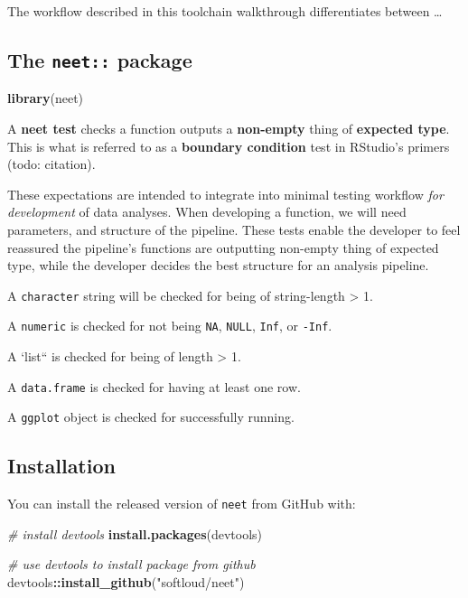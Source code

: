 \documentclass[
]{article}
\newenvironment{Shaded}{\begin{snugshade}}{\end{snugshade}}
\newcommand{\CommentTok}[1]{\textcolor[rgb]{0.56,0.35,0.01}{\textit{#1}}}
\newcommand{\KeywordTok}[1]{\textcolor[rgb]{0.13,0.29,0.53}{\textbf{#1}}}
\newcommand{\NormalTok}[1]{#1}
\newcommand{\OperatorTok}[1]{\textcolor[rgb]{0.81,0.36,0.00}{\textbf{#1}}}
\newcommand{\StringTok}[1]{\textcolor[rgb]{0.31,0.60,0.02}{#1}}
\begin{document}
The workflow described in this toolchain walkthrough differentiates
between \ldots{}

\hypertarget{the-neet-package}{%
\subsection{\texorpdfstring{The \texttt{neet::}
package}{The neet:: package}}\label{the-neet-package}}

\begin{Shaded}
\begin{Highlighting}[]
\KeywordTok{library}\NormalTok{(neet)}
\end{Highlighting}
\end{Shaded}

A \textbf{neet test} checks a function outputs a \textbf{non-empty}
thing of \textbf{expected type}. This is what is referred to as a
\textbf{boundary condition} test in RStudio's primers (todo: citation).

These expectations are intended to integrate into minimal testing
workflow \emph{for development} of data analyses. When developing a
function, we will need parameters, and structure of the pipeline. These
tests enable the developer to feel reassured the pipeline's functions
are outputting non-empty thing of expected type, while the developer
decides the best structure for an analysis pipeline.

A \texttt{character} string will be checked for being of string-length
\textgreater{} 1.

A \texttt{numeric} is checked for not being \texttt{NA}, \texttt{NULL},
\texttt{Inf}, or \texttt{-Inf}.

A `list`` is checked for being of length \textgreater{} 1.

A \texttt{data.frame} is checked for having at least one row.

A \texttt{ggplot} object is checked for successfully running.

\hypertarget{installation}{%
\subsection{Installation}\label{installation}}

You can install the released version of \texttt{neet} from GitHub with:

\begin{Shaded}
\begin{Highlighting}[]
\CommentTok{\# install devtools}
\KeywordTok{install.packages}\NormalTok{(devtools) }

\CommentTok{\# use devtools to install package from github}
\NormalTok{devtools}\OperatorTok{::}\KeywordTok{install\_github}\NormalTok{(}\StringTok{"softloud/neet"}\NormalTok{)}
\end{Highlighting}
\end{Shaded}
\end{document}
